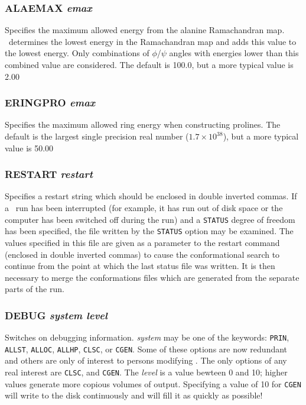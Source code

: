 \subsubsection{ALAEMAX {\em emax}}
Specifies the maximum allowed energy from the alanine Ramachandran map. 
\cs\ determines
the lowest energy in the Ramachandran map and adds this value to the lowest
energy. Only combinations of $\phi$/$\psi$ angles with energies lower than this
combined value are considered. The default is 100.0, but a more typical 
value is 2.00

\subsubsection{ERINGPRO {\em emax}}
Specifies the maximum allowed ring energy when constructing prolines.
The default is the largest single precision real number ($1.7\times10^{38}$),
but a more typical value is 50.00

\subsubsection{RESTART {\em restart}}
Specifies a restart string which should be enclosed in double inverted commas.
If a \cs\ run has been interrupted (for example, it has run out of disk
space or the computer has been switched off during the run) and a {\tt STATUS}
degree of freedom has been specified, the file written by the {\tt STATUS}
option
may be examined. The values specified in this file are given as a parameter
to the restart command (enclosed in double inverted commas) to cause the
conformational search to continue from the point at which the last status file
was written. It is then necessary to merge the conformations files which
are generated from the separate parts of the run.

\subsubsection{DEBUG {\em system level}}
Switches on debugging information. {\em system\/} may be one of the keywords:
{\tt PRIN}, {\tt ALLST}, {\tt ALLOC}, {\tt ALLHP}, {\tt CLSC}, or {\tt CGEN}.
Some of these options are now redundant and others are only of interest to
persons modifying \cs. The only options of any real interest are
{\tt CLSC}, and {\tt CGEN}. The {\em level\/} is a value bewteen 0 and 10;
higher values generate more copious volumes of output. Specifying a value of
10 for {\tt CGEN} will write to the disk continuously and will fill it as
quickly as possible!

